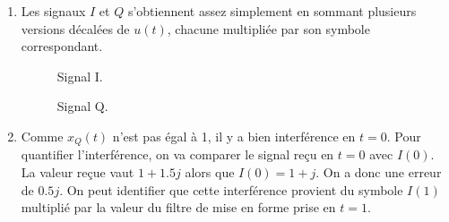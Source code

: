 \documentclass [a4paper, 11pt] {article}
\begin{document}
    \begin{reponse}
    
        \begin{enumerate}
            \item Les signaux $I$ et $Q$ s'obtiennent assez simplement en sommant plusieurs versions décalées de $u(t)$, chacune multipliée par son symbole correspondant.
            \begin{figure}[H]
                \centering
                \caption{Signal I.}
                \label{fig:i}
            \end{figure}
            \begin{figure}[H]
                \centering
                \caption{Signal Q.}
                \label{fig:q}
            \end{figure}
            \item Comme $x_Q(t)$ n'est pas égal à 1, il y a bien interférence en $t=0$. Pour quantifier l'interférence, on va comparer le signal reçu en $t=0$ avec $I(0)$. La valeur reçue vaut $1+1.5j$ alors que $I(0)=1+j$. On a donc une erreur de $0.5j$. On peut identifier que cette interférence provient du symbole $I(1)$ multiplié par la valeur du filtre de mise en forme prise en $t=1$.
        \end{enumerate}
    
    \end{reponse}
        
\end{document}
